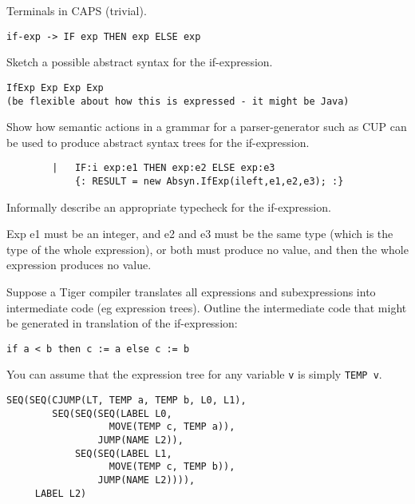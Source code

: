 \documentclass[11pt]{cityexam}
\begin{document}
\begin{questions}
\begin{subquestions}
\begin{modelanswer}
Terminals in CAPS (trivial).
\begin{verbatim}
if-exp -> IF exp THEN exp ELSE exp
\end{verbatim}
\end{modelanswer}

\subquestion
Sketch a possible abstract syntax for the if-expression.

\begin{modelanswer}
\begin{verbatim}
IfExp Exp Exp Exp
(be flexible about how this is expressed - it might be Java)
\end{verbatim}
\end{modelanswer}

\subquestion
Show how semantic actions in a grammar for a parser-generator such as CUP
can be used to produce abstract syntax trees for the if-expression. 

\begin{modelanswer}
\begin{verbatim}
        |   IF:i exp:e1 THEN exp:e2 ELSE exp:e3
            {: RESULT = new Absyn.IfExp(ileft,e1,e2,e3); :}
\end{verbatim}
\end{modelanswer}

\subquestion
Informally describe an appropriate typecheck for the if-expression.

\begin{modelanswer}
Exp e1 must be an integer, and e2 and e3 must be the same type 
(which is the type of the whole expression), or both must produce no value,
and then  the whole expression produces no value.
\end{modelanswer}

\subquestion

Suppose a Tiger compiler translates all expressions and subexpressions
into intermediate code (eg expression trees).
Outline the intermediate code that might be generated
in translation of the if-expression:
\begin{verbatim}
if a < b then c := a else c := b
\end{verbatim}
You can assume that the expression tree for any variable \verb"v" is
simply \verb"TEMP v".

\begin{modelanswer}
\begin{verbatim}
SEQ(SEQ(CJUMP(LT, TEMP a, TEMP b, L0, L1),
        SEQ(SEQ(SEQ(LABEL L0,
                  MOVE(TEMP c, TEMP a)),
                JUMP(NAME L2)),
            SEQ(SEQ(LABEL L1,
                  MOVE(TEMP c, TEMP b)),
                JUMP(NAME L2)))),
     LABEL L2)


\end{verbatim}
\end{modelanswer}
\end{subquestions}
\end{questions}
\end{document}
